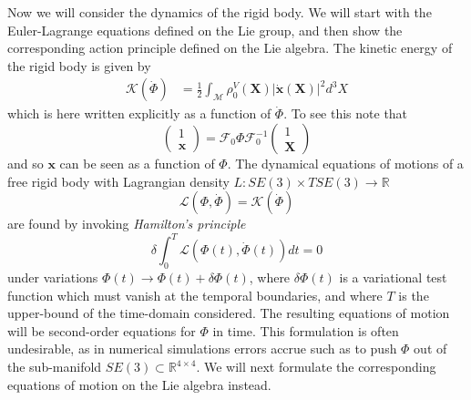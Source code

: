 Now we will consider the dynamics of the rigid body. We will start with the Euler-Lagrange equations defined on the Lie group, and then show the corresponding action principle defined on the Lie algebra. The kinetic energy of the rigid body is given by
\begin{equation}  \label{eq:rigid body kinetic energy}
\begin{aligned}
\mathcal{K}(\dot{\Phi}) & = \frac{1}{2} \int_\mathscr{M} \rho^V_0(\mathbf{X}) |\dot{\mathbf{x}}(\mathbf{X})|^2  d^3 X
\end{aligned}
\end{equation}
which is here written explicitly as a function of $\dot{\Phi}$. To see this note that
\begin{equation}
\begin{pmatrix} 1 \\ \mathbf{x} \end{pmatrix} = \mathcal{F}_0 \Phi \mathcal{F}_0^{-1} \begin{pmatrix} 1 \\ \mathbf{X} \end{pmatrix}
\end{equation}
and so $\mathbf{x}$ can be seen as a function of $\Phi$. The dynamical equations of motions of a free rigid body with Lagrangian density $L : SE(3) \times TSE(3) \to \mathbb{R}$
\begin{equation}
\mathcal{L}(\Phi, \dot{\Phi}) = \mathcal{K}(\dot{\Phi})
\end{equation}
are found by invoking \textit{Hamilton's principle}
\begin{equation} \label{eq:rigid body hamiltons principle}
\delta \int_0^{T} \mathcal{L}(\Phi(t), \dot{\Phi}(t)) dt = 0
\end{equation}
under variations $\Phi(t) \to \Phi(t) + \delta \Phi (t)$, where $\delta \Phi (t)$ is a variational test function which must vanish at the temporal boundaries, and where $T$ is the upper-bound of the time-domain considered. The resulting equations of motion will be second-order equations for $\Phi$ in time. This formulation is often undesirable, as in numerical simulations errors accrue such as to push $\Phi$ out of the sub-manifold $SE(3) \subset \mathbb{R}^{4 \times 4}$. We will next formulate the corresponding equations of motion on the Lie algebra instead.


